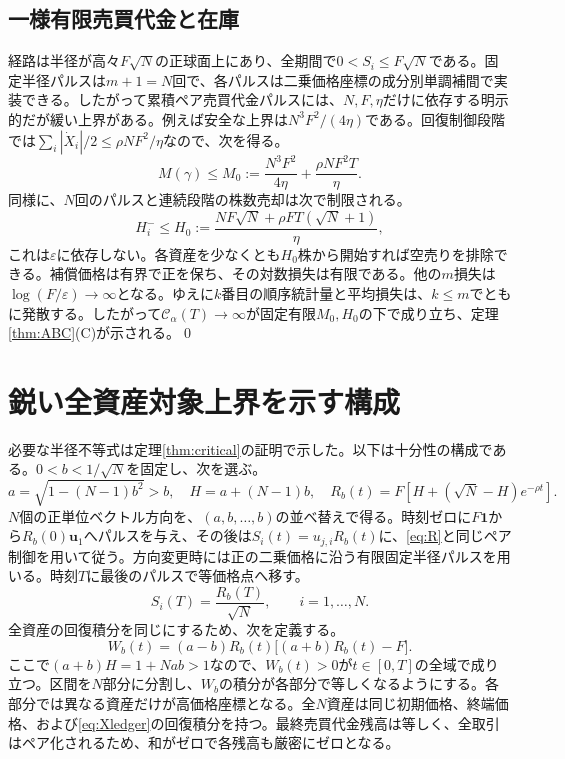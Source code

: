 \documentclass[11pt]{article}
\numberwithin{equation}{section}
\theoremstyle{definition}
\theoremstyle{remark}
\newcommand{\Cris}{\mathcal{C}}
\newcommand{\one}{\mathbf{1}}
\begin{document}
\subsection{一様有限売買代金と在庫}
経路は半径が高々$F\sqrt N$の正球面上にあり、全期間で$0<S_i\le F\sqrt N$である。固定半径パルスは$m+1=N$回で、各パルスは二乗価格座標の成分別単調補間で実装できる。したがって累積ペア売買代金パルスには、$N,F,\eta$だけに依存する明示的だが緩い上界がある。例えば安全な上界は$N^3F^2/(4\eta)$である。回復制御段階では$\sum_i|\dot X_i|/2\le \rho NF^2/\eta$なので、次を得る。
\begin{equation}\label{eq:uniformM}
M(\gamma)\le M_0:=\frac{N^3F^2}{4\eta}+\frac{\rho NF^2T}{\eta}.
\end{equation}
同様に、$N$回のパルスと連続段階の株数売却は次で制限される。
\begin{equation}\label{eq:uniformH}
H_i^-\le H_0:=\frac{NF\sqrt N+\rho FT(\sqrt N+1)}\eta,
\end{equation}
これは$\varepsilon$に依存しない。各資産を少なくとも$H_0$株から開始すれば空売りを排除できる。補償価格は有界で正を保ち、その対数損失は有限である。他の$m$損失は$\log(F/\varepsilon)\to\infty$となる。ゆえに$k$番目の順序統計量と平均損失は、$k\le m$でともに発散する。したがって$\Cris_\alpha(T)\to\infty$が固定有限$M_0,H_0$の下で成り立ち、定理\ref{thm:ABC}(C)が示される。\qed

\section{鋭い全資産対象上界を示す構成}\label{app:sharp}
必要な半径不等式は定理\ref{thm:critical}の証明で示した。以下は十分性の構成である。$0<b<1/\sqrt N$を固定し、次を選ぶ。
\begin{equation}\label{eq:fullab}
a=\sqrt{1-(N-1)b^2}>b,
\quad H=a+(N-1)b,
\quad R_b(t)=F\left[H+(\sqrt N-H)e^{-\rho t}\right].
\end{equation}
$N$個の正単位ベクトル方向を、$(a,b,\ldots,b)$の並べ替えで得る。時刻ゼロに$F\one$から$R_b(0)\bm u_1$へパルスを与え、その後は$S_i(t)=u_{j,i}R_b(t)$に、\eqref{eq:R}と同じペア制御を用いて従う。方向変更時には正の二乗価格に沿う有限固定半径パルスを用いる。時刻$T$に最後のパルスで等価格点へ移す。
\begin{equation}\label{eq:fullend}
S_i(T)=\frac{R_b(T)}{\sqrt N},\qquad i=1,\ldots,N.
\end{equation}
全資産の回復積分を同じにするため、次を定義する。
\begin{equation}\label{eq:fullW}
W_b(t)=(a-b)R_b(t)\big[(a+b)R_b(t)-F\big].
\end{equation}
ここで$(a+b)H=1+Nab>1$なので、$W_b(t)>0$が$t\in[0,T]$の全域で成り立つ。区間を$N$部分に分割し、$W_b$の積分が各部分で等しくなるようにする。各部分では異なる資産だけが高価格座標となる。全$N$資産は同じ初期価格、終端価格、および\eqref{eq:Xledger}の回復積分を持つ。最終売買代金残高は等しく、全取引はペア化されるため、和がゼロで各残高も厳密にゼロとなる。
\end{document}
